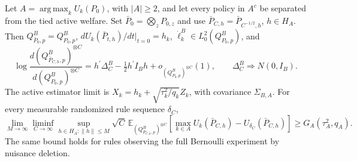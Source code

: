 Let \(A=\operatorname*{arg\,max}_kU_k(P_0)\), with \(|A|\geq2\), and let every policy in \(A^c\) be separated from the tied active welfare. Set \(\bar P_0=\bigotimes_zP_{0,z}\) and use \(\bar P_{C,h}=\bar P_{C^{-1/2},h}\), \(h\in H_A\). Then \(Q^B_{\bar P_0,p}=Q^B_{P_0,p}\), \(dU_k(\bar P_{t,h})/dt|_{t=0}=h_k\), \(\dot\ell_k^B\in L^2_0(Q^B_{P_0,p})\), and \[\log\frac{d(Q^B_{\bar P_{C,h},p})^{\otimes C}}{d(Q^B_{P_0,p})^{\otimes C}}=h^{\prime}\Delta_C^B-\tfrac12h^{\prime}I_Bh+o_{(Q^B_{P_0,p})^{\otimes C}}(1),\qquad \Delta_C^B\Rightarrow N(0,I_B).\] The active estimator limit is \(X_k=h_k+\sqrt{\tau_k^2/q_k}Z_k\), with covariance \(\Sigma_{B,A}\). For every measurable randomized rule sequence \(\delta_C\), \[\lim_{M\to\infty}\liminf_{C\to\infty}\sup_{h\in H_A:\lVert h\rVert\leq M}\sqrt C\,\mathbb E_{(Q^B_{\bar P_{C,h},p})^{\otimes C}}[\max_{k\in A}U_k(\bar P_{C,h})-U_{\delta_C}(\bar P_{C,h})]\geq G_A(\tau_A^2,q_A).\] The same bound holds for rules observing the full Bernoulli experiment by nuisance deletion.